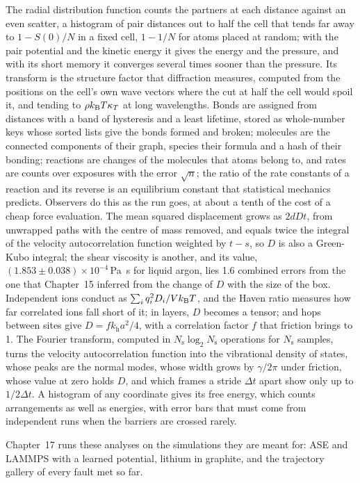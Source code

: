 
The radial distribution function counts the partners at each distance
against an even scatter, a histogram of pair distances out to half the
cell that tends far away to $1 - S(0)/N$ in a fixed cell, $1 - 1/N$ for
atoms placed at random; with the pair potential and the kinetic energy it
gives the energy and the pressure, and with its short memory it converges
several times sooner than the pressure. Its transform is the structure factor
that diffraction measures, computed from the positions on the cell's own
wave vectors where the cut at half the cell would spoil it, and tending
to $\rho k_{\mathrm{B}} T\kappa_T$ at long wavelengths.
Bonds are assigned from
distances with a band of hysteresis and a least lifetime, stored as
whole-number keys whose sorted lists give the bonds formed and broken;
molecules are the connected components of their graph, species their
formula and a hash of their bonding; reactions are changes of the
molecules that atoms belong to, and rates are counts over exposures with
the error $\sqrt n$; the ratio of the rate constants of a reaction and
its reverse is an equilibrium constant that statistical mechanics
predicts. Observers do this as the run goes, at about a tenth of the cost
of a cheap force evaluation.
The mean squared displacement grows as $2dDt$, from unwrapped
paths with the centre of mass removed, and equals twice the integral of
the velocity autocorrelation function weighted by $t - s$, so $D$ is also
a Green-Kubo integral; the shear viscosity is another, and its value,
$(1.853 \pm 0.038)\times10^{-4}$\,\si{\pascal\second} for liquid argon,
lies 1.6 combined errors from the one that Chapter~15 inferred from the
change of $D$ with the size of the box.
Independent ions conduct as $\sum_iq_i^2D_i/Vk_{\mathrm{B}} T$,
and the Haven ratio measures how far correlated ions fall short of it;
in layers, $D$ becomes a tensor; and hops between sites give $D =
fk_{\mathrm h}a^2/4$, with a correlation factor $f$ that friction brings to 1.
The Fourier transform, computed in $N_{\mathrm s}\log_2N_{\mathrm s}$
operations for $N_{\mathrm s}$ samples, turns the velocity
autocorrelation function into the vibrational density of states, whose
peaks are the normal modes, whose width grows by $\gamma/2\pi$ under
friction, whose value at zero holds $D$, and which frames a stride
$\Delta t$ apart show only up to $1/2\Delta t$.
A histogram of any
coordinate gives its free energy, which counts arrangements as well as
energies, with error bars that must come from independent runs when the
barriers are crossed rarely.

Chapter~17 runs these analyses on the simulations they are meant for:
ASE and LAMMPS with a learned potential, lithium in graphite, and the
trajectory gallery of every fault met so far.
